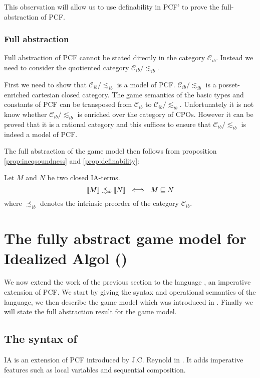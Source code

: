 This observation will allow us to use definability in PCF' to
prove the full-abstraction of PCF.


\subsubsection{Full abstraction}

Full abstraction of PCF cannot be stated directly in the category $\mathcal{C}_{ib}$. Instead we need to consider the quotiented category
$\mathcal{C}_{ib}/\lesssim_{ib}$.

First we need to show that $\mathcal{C}_{ib}/\lesssim_{ib}$ is a model of PCF.
$\mathcal{C}_{ib}/\lesssim_{ib}$ is a posset-enriched cartesian closed category. The game semantics of the basic types and constants of PCF
can be transposed from $\mathcal{C}_{ib}$ to $\mathcal{C}_{ib}/\lesssim_{ib}$. Unfortunately it is not know whether $\mathcal{C}_{ib}/\lesssim_{ib}$
is enriched over the category of CPOs. However it can be proved that it is a rational category \citep{abramsky94full}
and this suffices to ensure that $\mathcal{C}_{ib}/\lesssim_{ib}$ is indeed a model of PCF.

The full abstraction of the game model then follows from
proposition \ref{prop:ineqsoundness} and \ref{prop:definability}:
\begin{thm}
Let $M$ and $N$ be two closed IA-terms.
$${[\![ M ]\!]} \precsim_{ib} {[\![ N ]\!]} \ \iff \ M \sqsubseteq N$$
where $\precsim_{ib}$ denotes the intrinsic preorder of the category $\mathcal{C}_{ib}$.
\end{thm}

\section{The fully abstract game model for Idealized Algol (\ialgol)}

We now extend the work of the previous section to the language
\ialgol, an imperative extension of PCF. We start by giving the
syntax and operational semantics of the language, we then describe
the game model which was introduced in \cite{abramsky99full}.
Finally we will state the full abstraction result for the game
model.

\subsection{The syntax of \ialgol}
IA is an extension of PCF introduced by J.C. Reynold in
\cite{Reynolds81}. It adds imperative features such as local
variables and sequential composition.

